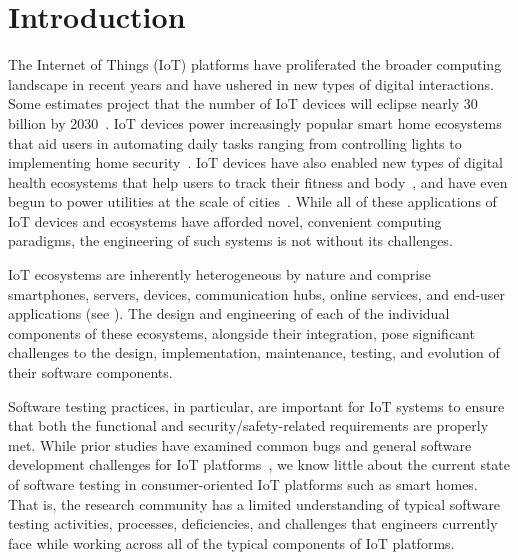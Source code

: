 \section{Introduction}
\label{sec:introduction}

The Internet of Things (IoT) platforms have proliferated the broader computing landscape in recent years and have ushered in new types of digital interactions. Some estimates project that the number of IoT devices will eclipse nearly 30 billion by 2030~\cite{iot-stats}. IoT devices power increasingly popular smart home ecosystems that aid users in automating daily tasks ranging from controlling lights to implementing home security~\cite{kafle_study_2019, manandhar_helion_2019}. IoT devices have also enabled new types of digital health ecosystems that help users to track their fitness and body~\cite{technogym}, and have even begun to power utilities at the scale of cities~\cite{singh-smart-cities}.  While all of these applications of IoT devices and ecosystems have afforded novel, convenient computing paradigms, the engineering of such systems is not without its challenges.

IoT ecosystems are inherently heterogeneous by nature and comprise smartphones, servers, devices, communication hubs, online services, and end-user applications (see ). The design and engineering of each of the individual components of these ecosystems, alongside their integration, pose significant challenges to the design, implementation, maintenance, testing, and evolution of their software components\cite{makhshari2021}. 

Software testing practices, in particular, are important for IoT systems to ensure that both the functional and security/safety-related requirements are properly met. %
While 
prior studies have examined common bugs and general software development challenges for IoT platforms~\cite{makhshari2021,Corno:2019,Corno:2020}, we know little about the current state of software testing in consumer-oriented IoT platforms such as smart homes. 
That is, the research community has a limited understanding of typical software testing activities, processes, deficiencies, and challenges that engineers currently face while working across all of the typical components of IoT platforms. 

